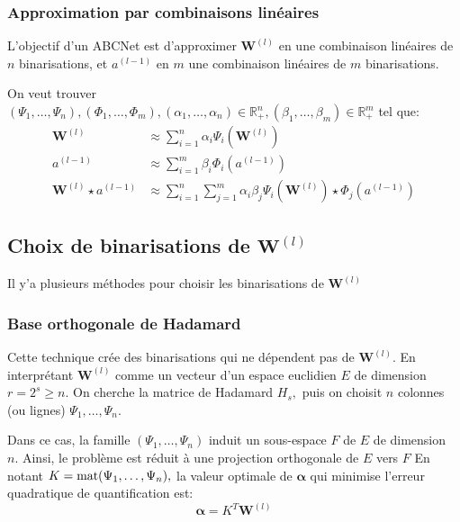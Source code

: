 \subsubsection{Approximation par combinaisons linéaires}
L'objectif d'un ABCNet est d'approximer $\boldsymbol{W}^{(l)}$ en une combinaison linéaires de $n$ binarisations, et $a^{(l-1)}$ en $m$ une combinaison linéaires de $m$ binarisations.

On veut trouver $\left(\Psi_1,\dots,\Psi_n\right), \left(\Phi_1,\dots,\Phi_m\right),(\alpha_1,\dots,\alpha_n)\in\mathbb{R}_+^n,(\beta_1,\dots,\beta_m)\in\mathbb{R}_+^m $ tel que:
\begin{align}
	\boldsymbol{W}^{(l)}&\approx \sum_{i=1}^n \alpha_i \Psi_i(\boldsymbol{W}^{(l)}) \label{ABCNet:W}  \\
	a^{(l-1)}&\approx \sum_{i=1}^m \beta_i \Phi_i(a^{(l-1)}) \label{ABCNet:a}\\
	\boldsymbol{W}^{(l)} \star a^{(l-1)} &\approx \sum_{i=1}^n\sum_{j=1}^m  \alpha_i  \beta_j\Psi_i(\boldsymbol{W}^{(l)})\star  \Phi_j(a^{(l-1)}) \label{ABCNet:z}
\end{align}

\subsection{Choix de binarisations de $\boldsymbol{W}^{(l)}$}
Il y'a plusieurs méthodes pour choisir les binarisations de $\boldsymbol{W}^{(l)}$
\subsubsection{Base orthogonale de Hadamard}
Cette technique crée des binarisations qui ne dépendent pas de $\boldsymbol{W}^{(l)}.$ En interprétant $\boldsymbol{W}^{(l)}$ comme un vecteur d'un espace euclidien $E$ de dimension $r=2^s\ge n.$ On  cherche la matrice de Hadamard $H_s,$ puis on choisit $n$ colonnes (ou lignes) $\Psi_1,\dots,\Psi_n$.

Dans ce cas, la famille $(\Psi_1,\dots,\Psi_n)$ induit un sous-espace $F$ de $E$ de dimension $n.$  
\newline Ainsi, le problème est réduit à une projection orthogonale de $E$ vers $F$    
\newline En notant $K=\operatorname{mat}(\Psi_1,\dots,\Psi_n),$ la valeur optimale de $\boldsymbol{\alpha}$ qui minimise l'erreur quadratique de quantification est:
\begin{equation}
	\boldsymbol{\alpha} = K^T\boldsymbol{W}^{(l)}
\end{equation}

